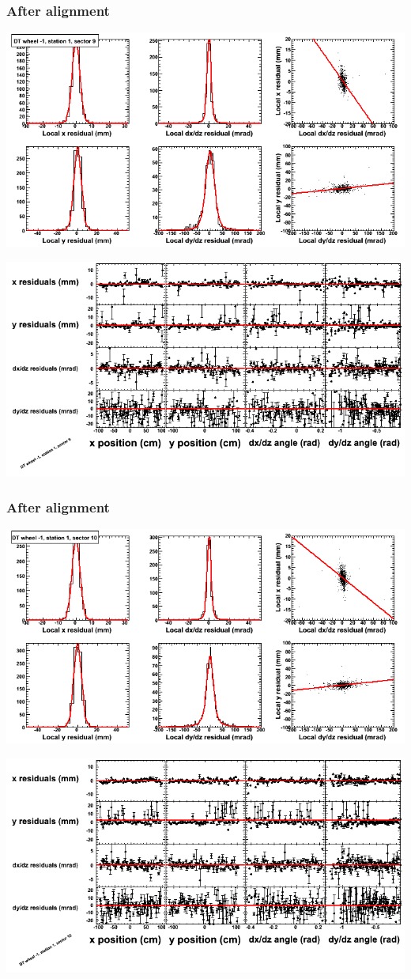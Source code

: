 \documentclass[compress]{beamer}
\begin{document}
\begin{frame}
\frametitle{After alignment}
\includegraphics[width=0.7\linewidth]{NOV4_fitfunctions/MBwhBst1sec09_bellcurves.png}

\includegraphics[width=0.7\linewidth]{NOV4_fitfunctions/MBwhBst1sec09_polynomials.png}
\end{frame}

\begin{frame}
\frametitle{After alignment}
\includegraphics[width=0.7\linewidth]{NOV4_fitfunctions/MBwhBst1sec10_bellcurves.png}

\includegraphics[width=0.7\linewidth]{NOV4_fitfunctions/MBwhBst1sec10_polynomials.png}
\end{frame}
\end{document}
